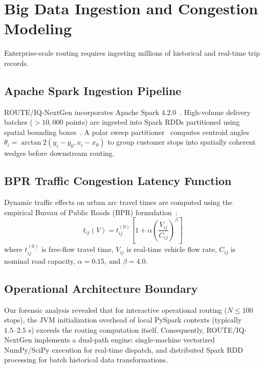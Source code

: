 \section{Big Data Ingestion and Congestion Modeling}
\label{sec:big_data}
Enterprise-scale routing requires ingesting millions of historical and real-time trip records.

\subsection{Apache Spark Ingestion Pipeline}
ROUTE/IQ-NextGen incorporates Apache Spark 4.2.0~\cite{zaharia2016apache}. High-volume delivery batches ($>10,000$ points) are ingested into Spark RDDs partitioned using spatial bounding boxes~\cite{yu2015geospark}. A polar sweep partitioner~\cite{gillett1974sweep} computes centroid angles $\theta_i = \arctan2(y_i - y_0, x_i - x_0)$ to group customer stops into spatially coherent wedges before downstream routing.

\subsection{BPR Traffic Congestion Latency Function}
Dynamic traffic effects on urban arc travel times are computed using the empirical Bureau of Public Roads (BPR) formulation~\cite{bpr1964traffic}:
\begin{equation}
t_{ij}(V) = t_{ij}^{(0)} \left[ 1 + \alpha \left(\frac{V_{ij}}{C_{ij}}\right)^\beta \right]
\end{equation}
where $t_{ij}^{(0)}$ is free-flow travel time, $V_{ij}$ is real-time vehicle flow rate, $C_{ij}$ is nominal road capacity, $\alpha = 0.15$, and $\beta = 4.0$. 

\subsection{Operational Architecture Boundary}
Our forensic analysis revealed that for interactive operational routing ($N \le 100$ stops), the JVM initialization overhead of local PySpark contexts (typically $1.5\text{--}2.5\text{ s}$) exceeds the routing computation itself. Consequently, ROUTE/IQ-NextGen implements a dual-path engine: single-machine vectorized NumPy/SciPy execution for real-time dispatch, and distributed Spark RDD processing for batch historical data transformations.
